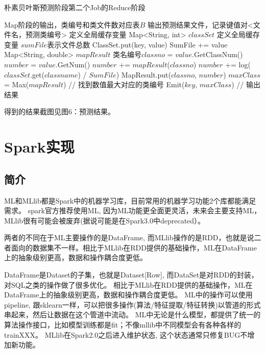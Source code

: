 \documentclass[lang=cn,11pt]{elegantpaper}
\begin{document}
\begin{algorithm}[!htb]
  \caption{朴素贝叶斯预测阶段第二个Job的Reduce阶段}
  \label{alg:Framwork}
  \begin{algorithmic}[1]
    \Require
    Map阶段的输出，类编号和类文件数对应表$B$
    \Ensure
    输出预测结果文件，记录键值对<文件名，预测类编号>
  \State 定义全局缓存变量 Map<String, int> $classSet$
  \State 定义全局缓存变量 $sumFile$表示文件总数
      \State ClassSet.put(key, value)
      \State SumFile += value
    \EndFor
  \EndFunction
    \State Map<String, double> $mapResult$
        \State 类名编号$classno$ = $value$.GetClassNum()
        \State $number$ = $value$.GetNum()
          \State $number$ += $mapResult$($classno$)
        \Else
          \State $number$ += log($classSet$.get($classname$) / $SumFile$)
        \EndIf  
        \State MapResult.put($classno$, $number$)
    \EndFor
    \State $maxClass$ = Max($mapResult$) // 找到数值最大对应的类编号
    \State Emit($key$, $maxClass$) // 输出结果
  \EndFunction
  \end{algorithmic}
\end{algorithm}

得到的结果截图见图6：预测结果。

\section{Spark实现}
\subsection{简介}
ML和MLlib都是Spark中的机器学习库，目前常用的机器学习功能2个库都能满足需求。
spark官方推荐使用ML, 因为ML功能更全面更灵活，未来会主要支持ML，MLlib很有可能会被废弃(据说可能是在Spark3.0中deprecated）。

两者的不同在于ML主要操作的是DataFrame, 而MLlib操作的是RDD，也就是说二者面向的数据集不一样。相比于MLlib在RDD提供的基础操作，ML在DataFrame上的抽象级别更高，数据和操作耦合度更低。

DataFrame是Dataset的子集，也就是Dataset[Row], 而DataSet是对RDD的封装，对SQL之类的操作做了很多优化。
相比于MLlib在RDD提供的基础操作，ML在DataFrame上的抽象级别更高，数据和操作耦合度更低。
ML中的操作可以使用pipeline, 跟sklearn一样，可以把很多操作(算法/特征提取/特征转换)以管道的形式串起来，然后让数据在这个管道中流动。
ML中无论是什么模型，都提供了统一的算法操作接口，比如模型训练都是fit；不像mllib中不同模型会有各种各样的trainXXX。
MLlib在Spark2.0之后进入维护状态, 这个状态通常只修复BUG不增加新功能。
\end{document}
